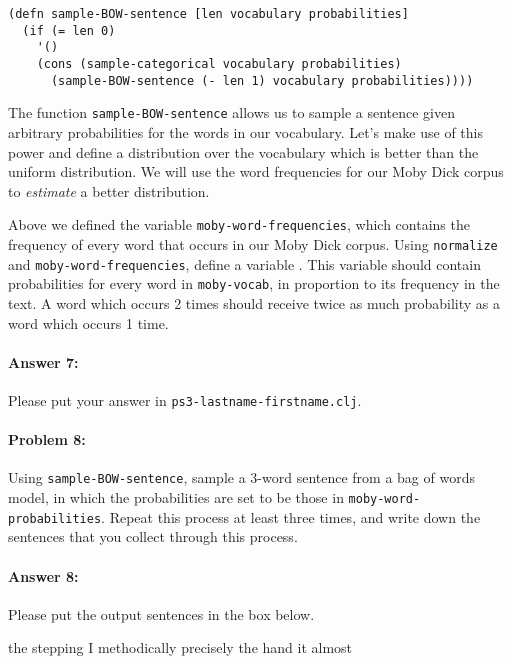 \documentclass[10pt]{article}
\newenvironment{AnswerBox}{\begin{mdframed}[style=simple]}{\end{mdframed}}
\newcommand{\required}[1]{{\color{blue}{#1}}}
\newcommand{\PSnum}{3}
\begin{document}
\begin{lstlisting}
(defn sample-BOW-sentence [len vocabulary probabilities]
  (if (= len 0)
    '()
    (cons (sample-categorical vocabulary probabilities)
	  (sample-BOW-sentence (- len 1) vocabulary probabilities))))
\end{lstlisting}

The function \texttt{sample-BOW-sentence} allows us to sample a
sentence given arbitrary probabilities for the words in our
vocabulary. Let's make use of this power and define a distribution
over the vocabulary which is better than the uniform distribution. We
will use the word frequencies for our Moby Dick corpus to
\emph{estimate} a better distribution.

Above we defined the variable \texttt{moby-word-frequencies}, which
contains the frequency of every word that occurs in our Moby Dick
corpus. Using \texttt{normalize} and \texttt{moby-word-frequencies},
define a variable \required{\texttt{moby-word-probabilities}}. This variable
should contain probabilities for every word in \texttt{moby-vocab}, in
proportion to its frequency in the text. A word which occurs 2 times
should receive twice as much probability as a word which occurs 1
time.

\paragraph{Answer 7:} Please put your answer in
\texttt{ps\PSnum-lastname-firstname.clj}.

\hrulefill %

\paragraph{Problem 8:}

Using \texttt{sample-BOW-sentence}, sample a 3-word sentence from a
bag of words model, in which the probabilities are set to be those in
\texttt{moby-word-probabilities}. Repeat this process at least three
times, and write down the sentences that you collect through this
process.

\paragraph{Answer 8:} Please put the output sentences in the box below.

\begin{AnswerBox}%

    the stepping I
    methodically precisely the
    hand it almost
\end{AnswerBox}%
\end{document}
